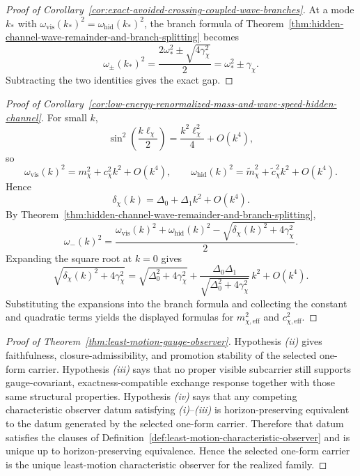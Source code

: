 \begin{proof}[Proof of Corollary~\ref{cor:exact-avoided-crossing-coupled-wave-branches}]
\label{proof:cor:exact-avoided-crossing-coupled-wave-branches}
At a mode \(k_\ast\) with
\(\omega_{\mathrm{vis}}(k_\ast)^2=\omega_{\mathrm{hid}}(k_\ast)^2\), the
branch formula of
Theorem~\ref{thm:hidden-channel-wave-remainder-and-branch-splitting} becomes
\[
\omega_{\pm}(k_\ast)^2
=
\frac{2\omega_\ast^2\pm\sqrt{4\gamma_{\chi}^2}}{2}
=
\omega_\ast^2\pm\gamma_{\chi}.
\]
Subtracting the two identities gives the exact gap.
\end{proof}

\begin{proof}[Proof of Corollary~\ref{cor:low-energy-renormalized-mass-and-wave-speed-hidden-channel}]
\label{proof:cor:low-energy-renormalized-mass-and-wave-speed-hidden-channel}
For small \(k\),
\[
\sin^2\!\left(\frac{k\ell_{\chi}}{2}\right)
=
\frac{k^2\ell_{\chi}^2}{4}+O(k^4),
\]
so
\[
\omega_{\mathrm{vis}}(k)^2
=
m_{\chi}^2+c_{\chi}^2k^2+O(k^4),
\qquad
\omega_{\mathrm{hid}}(k)^2
=
\widetilde m_{\chi}^2+\widetilde c_{\chi}^2k^2+O(k^4).
\]
Hence
\[
\delta_{\chi}(k)
=
\Delta_0+\Delta_1 k^2+O(k^4).
\]
By
Theorem~\ref{thm:hidden-channel-wave-remainder-and-branch-splitting},
\[
\omega_-(k)^2
=
\frac{
\omega_{\mathrm{vis}}(k)^2+\omega_{\mathrm{hid}}(k)^2
-\sqrt{\delta_{\chi}(k)^2+4\gamma_{\chi}^2}
}{2}.
\]
Expanding the square root at \(k=0\) gives
\[
\sqrt{\delta_{\chi}(k)^2+4\gamma_{\chi}^2}
=
\sqrt{\Delta_0^2+4\gamma_{\chi}^2}
+
\frac{\Delta_0\Delta_1}{\sqrt{\Delta_0^2+4\gamma_{\chi}^2}}\,k^2
+
O(k^4).
\]
Substituting the expansions into the branch formula and collecting the constant
and quadratic terms yields the displayed formulas for
\(m_{\chi,\mathrm{eff}}^2\) and \(c_{\chi,\mathrm{eff}}^2\).
\end{proof}


\begin{proof}[Proof of Theorem~\ref{thm:least-motion-gauge-observer}]
\label{proof:thm:least-motion-gauge-observer}
Hypothesis \emph{(ii)} gives faithfulness, closure-admissibility, and
promotion stability of the selected one-form carrier. Hypothesis \emph{(iii)}
says that no proper visible subcarrier still supports gauge-covariant,
exactness-compatible exchange response together with those same structural
properties. Hypothesis \emph{(iv)} says that any competing characteristic
observer datum satisfying \emph{(i)}--\emph{(iii)} is horizon-preserving
equivalent to the datum generated by the selected one-form carrier. Therefore
that datum satisfies the clauses of
Definition~\ref{def:least-motion-characteristic-observer} and is unique up to
horizon-preserving equivalence. Hence the selected one-form carrier is the
unique least-motion characteristic observer for the realized family.
\end{proof}

